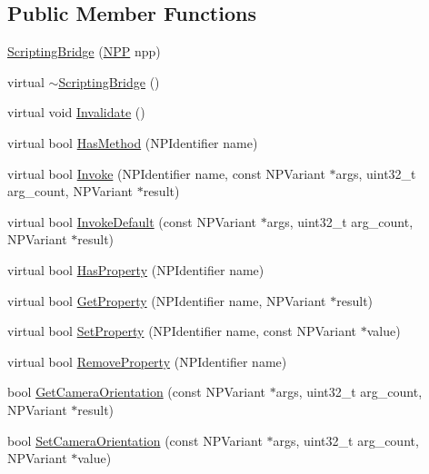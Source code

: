 \subsection*{Public Member Functions}
\begin{DoxyCompactItemize}
\item 
\hyperlink{classtumbler_1_1_scripting_bridge_aa7abb8784b22a793d795e872841b4bac}{ScriptingBridge} (\hyperlink{struct___n_p_p}{NPP} npp)
\item 
virtual \hyperlink{classtumbler_1_1_scripting_bridge_abe0d3eec9a772e0bc7f906cbc432d58d}{$\sim$ScriptingBridge} ()
\item 
virtual void \hyperlink{classtumbler_1_1_scripting_bridge_a79ca9287d682b30670932c235ce025b4}{Invalidate} ()
\item 
virtual bool \hyperlink{classtumbler_1_1_scripting_bridge_acd4789c8a9668e86ad02949ac7e88481}{HasMethod} (NPIdentifier name)
\item 
virtual bool \hyperlink{classtumbler_1_1_scripting_bridge_a70638ad7da4726fb8ccbc6f49868fafc}{Invoke} (NPIdentifier name, const NPVariant $\ast$args, uint32\_\-t arg\_\-count, NPVariant $\ast$result)
\item 
virtual bool \hyperlink{classtumbler_1_1_scripting_bridge_abc3713f16c739bb1c547def1afc5c93c}{InvokeDefault} (const NPVariant $\ast$args, uint32\_\-t arg\_\-count, NPVariant $\ast$result)
\item 
virtual bool \hyperlink{classtumbler_1_1_scripting_bridge_af5fea670d935111ef96b2ecc3adc8576}{HasProperty} (NPIdentifier name)
\item 
virtual bool \hyperlink{classtumbler_1_1_scripting_bridge_a7f8c653d8a5cb632eae37e1d59459c31}{GetProperty} (NPIdentifier name, NPVariant $\ast$result)
\item 
virtual bool \hyperlink{classtumbler_1_1_scripting_bridge_a841486a4fe8e3245dd8d1711e2c72dd3}{SetProperty} (NPIdentifier name, const NPVariant $\ast$value)
\item 
virtual bool \hyperlink{classtumbler_1_1_scripting_bridge_a58c45c6be183d37e0fa26de95b4410a1}{RemoveProperty} (NPIdentifier name)
\item 
bool \hyperlink{classtumbler_1_1_scripting_bridge_ace2d208ee47d10881e48945a1b9deb1e}{GetCameraOrientation} (const NPVariant $\ast$args, uint32\_\-t arg\_\-count, NPVariant $\ast$result)
\item 
bool \hyperlink{classtumbler_1_1_scripting_bridge_a9e3ffd7304dc607ddecad7cb8774009a}{SetCameraOrientation} (const NPVariant $\ast$args, uint32\_\-t arg\_\-count, NPVariant $\ast$value)
\end{DoxyCompactItemize}
